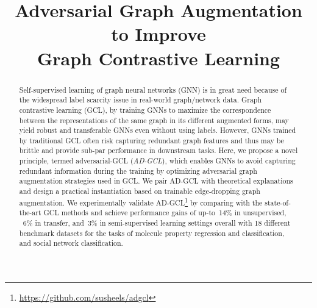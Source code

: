\title{Adversarial Graph Augmentation 
to Improve \\ Graph Contrastive Learning}



\maketitle
\vspace{-5mm}
\begin{abstract}
\vspace{-2mm}
Self-supervised learning of graph neural networks (GNN) is in great need because of the widespread label scarcity issue in real-world graph/network data.
Graph contrastive learning (GCL), by training GNNs to maximize the correspondence between the representations of the same graph in its different augmented forms, may yield robust and transferable GNNs even without using labels. However, GNNs trained by traditional GCL often risk capturing redundant graph features and thus may be brittle and provide sub-par performance in downstream tasks. 
Here, we propose a novel principle, termed adversarial-GCL (\textit{AD-GCL}), which enables GNNs to avoid capturing redundant information during the training by optimizing adversarial graph augmentation strategies used in GCL. 
We pair AD-GCL with theoretical explanations and design a practical instantiation based on trainable edge-dropping graph augmentation.
We experimentally validate AD-GCL\footnote{\url{https://github.com/susheels/adgcl}} by comparing with the state-of-the-art GCL methods and achieve performance gains of up-to~14\% in unsupervised, ~6\% in transfer, and~3\% in semi-supervised learning settings overall with 18 different benchmark datasets for the tasks of molecule property regression and classification, and social network classification.
\end{abstract}

\vspace{-3mm}
